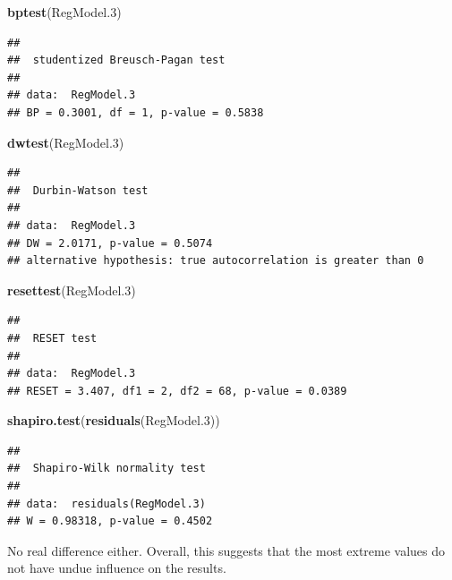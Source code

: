 \documentclass[
  12pt,
]{book}
\newenvironment{Shaded}{\begin{snugshade}}{\end{snugshade}}
\newcommand{\FloatTok}[1]{\textcolor[rgb]{0.00,0.00,0.81}{#1}}
\newcommand{\KeywordTok}[1]{\textcolor[rgb]{0.13,0.29,0.53}{\textbf{#1}}}
\newcommand{\NormalTok}[1]{#1}
\begin{document}
\begin{Shaded}
\begin{Highlighting}[]
\KeywordTok{bptest}\NormalTok{(RegModel}\FloatTok{.3}\NormalTok{)}
\end{Highlighting}
\end{Shaded}

\begin{verbatim}
## 
##  studentized Breusch-Pagan test
## 
## data:  RegModel.3
## BP = 0.3001, df = 1, p-value = 0.5838
\end{verbatim}

\begin{Shaded}
\begin{Highlighting}[]
\KeywordTok{dwtest}\NormalTok{(RegModel}\FloatTok{.3}\NormalTok{)}
\end{Highlighting}
\end{Shaded}

\begin{verbatim}
## 
##  Durbin-Watson test
## 
## data:  RegModel.3
## DW = 2.0171, p-value = 0.5074
## alternative hypothesis: true autocorrelation is greater than 0
\end{verbatim}

\begin{Shaded}
\begin{Highlighting}[]
\KeywordTok{resettest}\NormalTok{(RegModel}\FloatTok{.3}\NormalTok{)}
\end{Highlighting}
\end{Shaded}

\begin{verbatim}
## 
##  RESET test
## 
## data:  RegModel.3
## RESET = 3.407, df1 = 2, df2 = 68, p-value = 0.0389
\end{verbatim}

\begin{Shaded}
\begin{Highlighting}[]
\KeywordTok{shapiro.test}\NormalTok{(}\KeywordTok{residuals}\NormalTok{(RegModel}\FloatTok{.3}\NormalTok{))}
\end{Highlighting}
\end{Shaded}

\begin{verbatim}
## 
##  Shapiro-Wilk normality test
## 
## data:  residuals(RegModel.3)
## W = 0.98318, p-value = 0.4502
\end{verbatim}

No real difference either. Overall, this suggests that the most extreme values do not have undue influence on the results.
\end{document}
